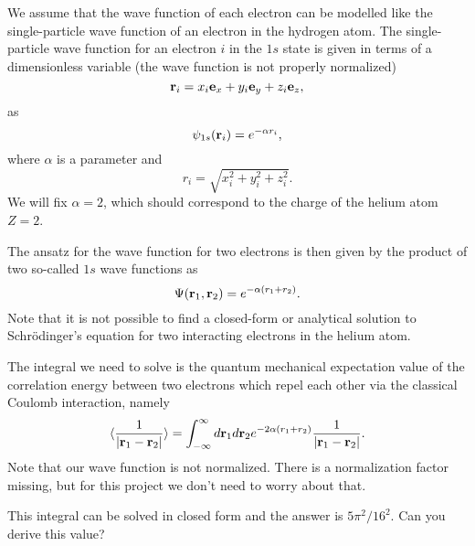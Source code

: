 \documentclass[11pt,a4wide]{article}
\begin{document}
We assume that the wave function of each electron can be modelled like the single-particle
wave function of an electron in the hydrogen atom. The single-particle wave function  for an electron $i$ in the 
$1s$ state 
is given in terms of a dimensionless variable    (the wave function is not properly normalized)
\[
   {\bf r}_i =  x_i {\bf e}_x + y_i {\bf e}_y +z_i {\bf e}_z ,
\]
as
\[
   \psi_{1s}({\bf r}_i)  =   e^{-\alpha r_i},
\]
where $\alpha$ is a parameter and 
\[
r_i = \sqrt{x_i^2+y_i^2+z_i^2}.
\]
We will fix $\alpha=2$, which should correspond to the charge of the helium atom $Z=2$. 

The ansatz for the wave function for two electrons is then given by the product of two 
so-called 
$1s$ wave functions as 
\[
   \Psi({\bf r}_1,{\bf r}_2)  =   e^{-\alpha (r_1+r_2)}.
\]
Note that it is not possible to find a closed-form or analytical  solution to Schr\"odinger's equation for 
two interacting electrons in the helium atom. 

The integral we need to solve is the quantum mechanical expectation value of the correlation
energy between two electrons which repel each other via the classical Coulomb interaction, namely
\begin{equation}\label{eq:correlationenergy}
   \langle \frac{1}{|{\bf r}_1-{\bf r}_2|} \rangle =
   \int_{-\infty}^{\infty} d{\bf r}_1d{\bf r}_2  e^{-2\alpha (r_1+r_2)}\frac{1}{|{\bf r}_1-{\bf r}_2|}.
\end{equation}
Note that our wave function is not normalized. There is a normalization factor missing, but for this project
we don't need to worry about that.

This integral can be solved in closed form and the answer is $5\pi^2/16^2$. Can you derive this value?
\end{document}
